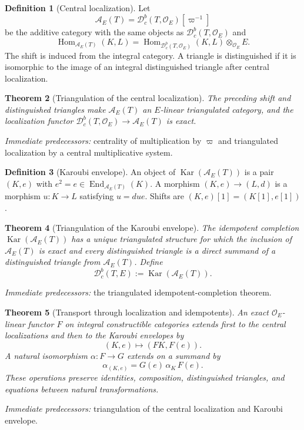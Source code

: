 \documentclass[10pt]{article}
\newtheorem{theorem}{Theorem}[section]
\theoremstyle{definition}
\newtheorem{definition}[theorem]{Definition}
\newcommand{\Dbc}{\mathcal D^b_c}
\newcommand{\Kar}{\operatorname{Kar}}
\newcommand{\Hom}{\operatorname{Hom}}
\newcommand{\pred}[1]{\par\smallskip\begingroup\footnotesize\raggedright
\emph{Immediate predecessors:} #1.\par\endgroup}
\begin{document}
\begin{definition}[Central localization]
Let
\[
 \mathcal A_E(T)=
 \Dbc(T,\mathcal O_E)[\varpi^{-1}]
\]
be the additive category with the same objects as
\(\Dbc(T,\mathcal O_E)\) and
\[
 \Hom_{\mathcal A_E(T)}(K,L)=
 \Hom_{\Dbc(T,\mathcal O_E)}(K,L)\otimes_{\mathcal O_E}E.
\]
The shift is induced from the integral category.  A triangle is
distinguished if it is isomorphic to the image of an integral
distinguished triangle after central localization.
\end{definition}

\begin{theorem}[Triangulation of the central localization]
The preceding shift and distinguished triangles make
\(\mathcal A_E(T)\) an \(E\)-linear triangulated category, and the
localization functor
\(\Dbc(T,\mathcal O_E)\to\mathcal A_E(T)\) is exact.
\end{theorem}
\pred{centrality of multiplication by \(\varpi\) and triangulated localization by a central multiplicative system}

\begin{definition}[Karoubi envelope]
An object of \(\Kar(\mathcal A_E(T))\) is a pair \((K,e)\) with
\(e^2=e\in\operatorname{End}_{\mathcal A_E(T)}(K)\).  A morphism
\((K,e)\to(L,d)\) is a morphism \(u:K\to L\) satisfying
\(u=due\).  Shifts are \((K,e)[1]=(K[1],e[1])\).
\end{definition}

\begin{theorem}[Triangulation of the Karoubi envelope]
The idempotent completion \(\Kar(\mathcal A_E(T))\) has a unique
triangulated structure for which the inclusion of \(\mathcal A_E(T)\) is
exact and every distinguished triangle is a direct summand of a
distinguished triangle from \(\mathcal A_E(T)\).  Define
\[
 \Dbc(T,E):=\Kar(\mathcal A_E(T)).
\]
\end{theorem}
\pred{the triangulated idempotent-completion theorem}

\begin{theorem}[Transport through localization and idempotents]
An exact \(\mathcal O_E\)-linear functor \(F\) on integral constructible
categories extends first to the central localizations and then to the
Karoubi envelopes by
\[
 (K,e)\longmapsto(FK,F(e)).
\]
A natural isomorphism \(\alpha:F\to G\) extends on a summand by
\[
 \alpha_{(K,e)}=G(e)\,\alpha_K\,F(e).
\]
These operations preserve identities, composition, distinguished
triangles, and equations between natural transformations.
\end{theorem}
\pred{triangulation of the central localization and Karoubi envelope}
\end{document}
